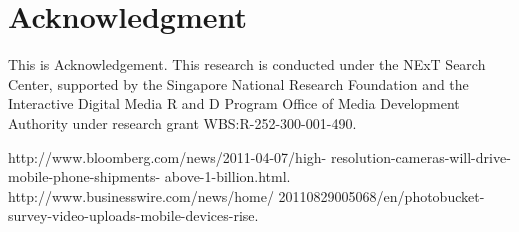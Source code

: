 \documentclass{sig-alternate-05-2015}
\begin{document}
\section{Acknowledgment}
This is Acknowledgement.
This research is conducted under the NExT Search Center, supported by the Singapore National Research Foundation and the Interactive Digital Media R and D Program Office of Media Development Authority under research grant WBS:R-252-300-001-490.

\begin{thebibliography}{9}
http://www.bloomberg.com/news/2011-04-07/high-
resolution-cameras-will-drive-mobile-phone-shipments-
above-1-billion.html. 
http://www.businesswire.com/news/home/
20110829005068/en/photobucket-survey-video-uploads-mobile-devices-rise. 
 

\end{thebibliography}
\end{document}
